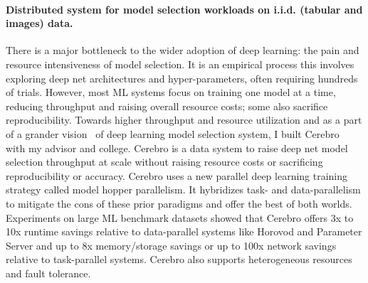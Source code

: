 \documentclass[letterpaper]{article}
\begin{document}

\paragraph{Distributed system for model selection workloads on i.i.d. (tabular and images) data.} There is a major bottleneck to the wider adoption of deep learning: the pain and resource intensiveness of model selection. It is an empirical process this involves exploring deep net architectures and hyper-parameters, often requiring hundreds of trials. However, most ML systems focus on training one model at a time, reducing throughput and raising overall resource costs; some also sacrifice reproducibility. Towards higher throughput and resource utilization and as a part of a grander vision~\cite{cerebrocidr} of deep learning model selection system, I built Cerebro~\cite{cerebro} with my advisor and college. Cerebro is a data system to raise deep net model selection throughput at scale without raising resource costs or sacrificing reproducibility or accuracy. Cerebro uses a new parallel deep learning training strategy called model hopper parallelism. It hybridizes task- and data-parallelism to mitigate the cons of these prior paradigms and offer the best of both worlds. Experiments on large ML benchmark datasets showed that Cerebro offers 3x to 10x runtime savings relative to data-parallel systems like Horovod and Parameter Server and up to 8x memory/storage savings or up to 100x network savings relative to task-parallel systems. Cerebro also supports heterogeneous resources and fault tolerance.
\end{document}
